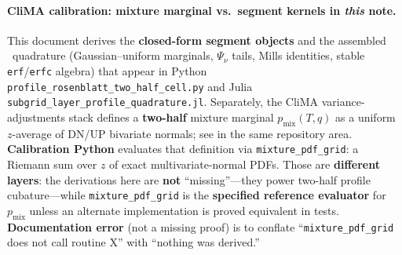 \documentclass[11pt,a4paper]{article}
\begin{document}
\paragraph{CliMA calibration: mixture marginal vs.\ segment kernels in \emph{this} note.}
This document derives the \textbf{closed-form segment objects} and the assembled \profileros\ quadrature (Gaussian--uniform marginals, $\Psi_\nu$ tails, Mills identities, stable \texttt{erf}/\texttt{erfc} algebra) that appear in Python \texttt{profile\_rosenblatt\_two\_half\_cell.py} and Julia \texttt{subgrid\_layer\_profile\_quadrature.jl}.
Separately, the CliMA variance-adjustments stack defines a \textbf{two-half} mixture marginal $p_{\mathrm{mix}}(T,q)$ as a uniform $z$-average of DN/UP bivariate normals; see  in the same repository area.
\textbf{Calibration Python} evaluates that definition via \texttt{mixture\_pdf\_grid}: a Riemann sum over $z$ of exact multivariate-normal PDFs.
Those are \textbf{different layers}: the derivations here are \textbf{not} ``missing''---they power two-half profile cubature---while \texttt{mixture\_pdf\_grid} is the \textbf{specified reference evaluator} for $p_{\mathrm{mix}}$ unless an alternate implementation is proved equivalent in tests.
\textbf{Documentation error} (not a missing proof) is to conflate ``\texttt{mixture\_pdf\_grid} does not call routine X'' with ``nothing was derived.''
\end{document}
